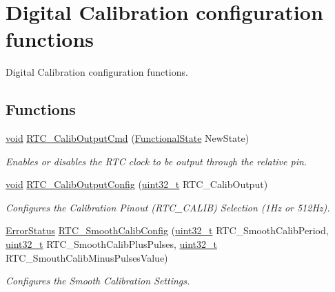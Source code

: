 \hypertarget{group___r_t_c___group7}{\section{Digital Calibration configuration functions}
\label{group___r_t_c___group7}
}


Digital Calibration configuration functions.  


\subsection*{Functions}
\begin{DoxyCompactItemize}
\item 
\hyperlink{group___n_a_m_e_ga18028b8badbf1ea7e704ccac3c488e82}{void} \hyperlink{group___r_t_c___group7_ga25eaa2de5ee858a4572d5fb1eb146ff8}{R\-T\-C\-\_\-\-Calib\-Output\-Cmd} (\hyperlink{group___exported__types_gac9a7e9a35d2513ec15c3b537aaa4fba1}{Functional\-State} New\-State)
\begin{DoxyCompactList}\small\item\em Enables or disables the R\-T\-C clock to be output through the relative pin. \end{DoxyCompactList}\item 
\hyperlink{group___n_a_m_e_ga18028b8badbf1ea7e704ccac3c488e82}{void} \hyperlink{group___r_t_c___group7_ga2139adc802bdb6882904c0b855d50b29}{R\-T\-C\-\_\-\-Calib\-Output\-Config} (\hyperlink{stdint_8h_a435d1572bf3f880d55459d9805097f62}{uint32\-\_\-t} R\-T\-C\-\_\-\-Calib\-Output)
\begin{DoxyCompactList}\small\item\em Configures the Calibration Pinout (R\-T\-C\-\_\-\-C\-A\-L\-I\-B) Selection (1\-Hz or 512\-Hz). \end{DoxyCompactList}\item 
\hyperlink{group___exported__types_ga8333b96c67f83cba354b3407fcbb6ee8}{Error\-Status} \hyperlink{group___r_t_c___group7_ga91a28dcc7d45340a469dd8b8c029f841}{R\-T\-C\-\_\-\-Smooth\-Calib\-Config} (\hyperlink{stdint_8h_a435d1572bf3f880d55459d9805097f62}{uint32\-\_\-t} R\-T\-C\-\_\-\-Smooth\-Calib\-Period, \hyperlink{stdint_8h_a435d1572bf3f880d55459d9805097f62}{uint32\-\_\-t} R\-T\-C\-\_\-\-Smooth\-Calib\-Plus\-Pulses, \hyperlink{stdint_8h_a435d1572bf3f880d55459d9805097f62}{uint32\-\_\-t} R\-T\-C\-\_\-\-Smouth\-Calib\-Minus\-Pulses\-Value)
\begin{DoxyCompactList}\small\item\em Configures the Smooth Calibration Settings. \end{DoxyCompactList}\item 

\end{DoxyCompactItemize}
